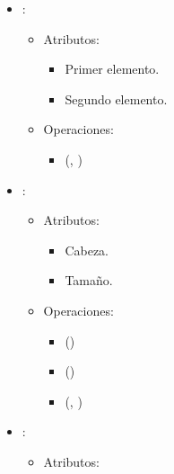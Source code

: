 \documentclass[11pt]{article}
\begin{document}
   \begin{itemize}
      \item {}:
      \begin{itemize}
         \item Atributos:

         \begin{itemize}
            \item Primer elemento.
            \item Segundo elemento.
         \end{itemize}
      \end{itemize}

      \begin{itemize}
         \item Operaciones:

         \begin{itemize}
            \item {}(, )
         \end{itemize}
      \end{itemize}

      \item {}:

      \begin{itemize}
         \item Atributos:

         \begin{itemize}
            \item Cabeza.
            \item Tamaño.
         \end{itemize}
      \end{itemize}

      \begin{itemize}
         \item Operaciones:

         \begin{itemize}
            \item {}()
            \item {}()
            \item {}(, )
         \end{itemize}
      \end{itemize}

      \item {}:
      
      \begin{itemize}
         \item Atributos:


\end{itemize}
\end{itemize}
\end{document}

